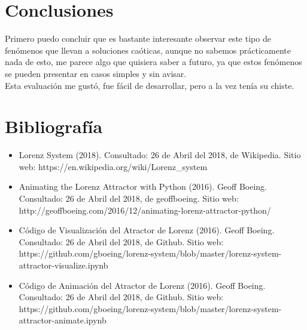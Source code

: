 \documentclass[12pt]{article}
\begin{document}
\clearpage

\section{Conclusiones}

Primero puedo concluir que es bastante interesante observar este tipo de fenómenos que llevan a soluciones caóticas, aunque no sabemos prácticamente nada de esto, me parece algo que quisiera saber a futuro, ya que estos fenómenos se pueden presentar en casos simples y sin avisar.  \\ 

Esta evaluación me gustó, fue fácil de desarrollar, pero a la vez tenía su chiste. 

\section{Bibliografía}
\begin{itemize}
\item Lorenz System (2018). Consultado: 26 de Abril del 2018, de Wikipedia. Sitio web: https://en.wikipedia.org/wiki/Lorenz\_system
\item Animating the Lorenz Attractor with Python (2016). Geoff Boeing. Consultado: 26 de Abril del 2018, de geoffboeing. Sitio web:  http://geoffboeing.com/2016/12/animating-lorenz-attractor-python/
\item Código de Visualización del Atractor de Lorenz (2016). Geoff Boeing. Consultado: 26 de Abril del 2018, de Github. Sitio web:  https://github.com/gboeing/lorenz-system/blob/master/lorenz-system-attractor-visualize.ipynb
\item Código de Animación del Atractor de Lorenz (2016). Geoff Boeing. Consultado: 26 de Abril del 2018, de Github. Sitio web:  https://github.com/gboeing/lorenz-system/blob/master/lorenz-system-attractor-animate.ipynb
\end{itemize}
\end{document}
